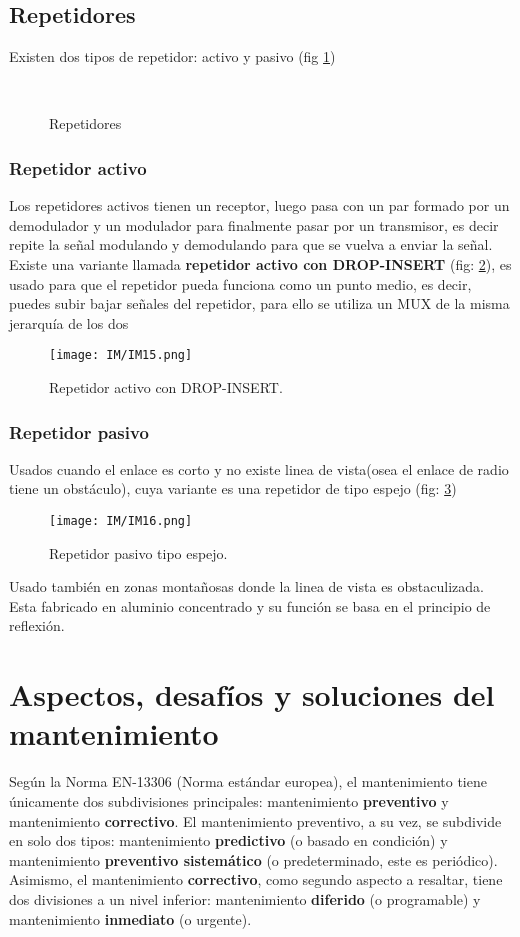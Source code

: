 \documentclass[
	12pt, %
	fleqn, %
	a4paper, %
]{LegrandOrangeBook}
\begin{document}
\section{Repetidores}
Existen dos tipos de repetidor: activo y pasivo (fig \ref{fig:tipos de repetidor})
\begin{figure}[H]
\centering
{}\\
\caption{Repetidores}
\label{fig:tipos de repetidor}
\end{figure}
\subsection{Repetidor activo}\label{Repetidor activo}
Los repetidores activos tienen un receptor, luego pasa con un par formado por un demodulador y un modulador para finalmente pasar por un transmisor, es decir repite la señal modulando y demodulando para que se vuelva a enviar la señal. Existe una variante llamada \textbf{repetidor activo con DROP-INSERT} (fig: \ref{fig:repetidor dropinsert}), es usado para que el repetidor pueda funciona como un punto medio, es decir, puedes subir bajar señales del repetidor, para ello se utiliza un MUX de la misma jerarquía de los dos
\begin{figure}[]
\centering
\texttt{[image: IM/IM15.png]}
\caption{Repetidor activo con DROP-INSERT.}
\label{fig:repetidor dropinsert}
\end{figure}
\subsection{Repetidor pasivo}
Usados cuando el enlace es corto y no existe linea de vista(osea el enlace de radio tiene un obstáculo), cuya variante es una repetidor de tipo espejo (fig: \ref{fig:repetidor pasivo espejo})
\begin{figure}[]
\centering
\texttt{[image: IM/IM16.png]}
\caption{Repetidor pasivo tipo espejo.}
\label{fig:repetidor pasivo espejo}
\end{figure}
Usado también en zonas montañosas donde la linea de vista es obstaculizada. Esta fabricado en aluminio concentrado y su función se basa en el principio de reflexión.
\chapter{Aspectos, desafíos y soluciones del mantenimiento}
Según la Norma EN-13306 (Norma estándar europea), el mantenimiento tiene únicamente dos subdivisiones principales: mantenimiento \textbf{preventivo} y mantenimiento \textbf{correctivo}. El mantenimiento preventivo, a su vez, se subdivide en solo dos tipos: mantenimiento \textbf{predictivo} (o basado en condición) y mantenimiento \textbf{preventivo sistemático} (o predeterminado, este es periódico).\\
Asimismo, el mantenimiento \textbf{correctivo}, como segundo aspecto a resaltar, tiene dos divisiones a un nivel inferior: mantenimiento \textbf{diferido} (o programable) y mantenimiento \textbf{inmediato} (o urgente).
\end{document}
